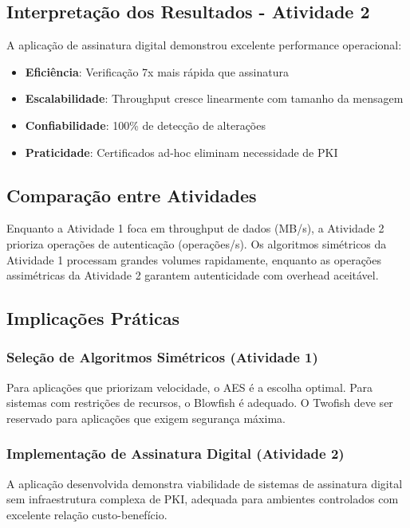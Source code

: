 \documentclass[12pt,a4paper,oneside]{article}
\begin{document}
\subsection{Interpretação dos Resultados - Atividade 2}

A aplicação de assinatura digital demonstrou excelente performance operacional:

\begin{itemize}
    \item \textbf{Eficiência}: Verificação 7x mais rápida que assinatura
    \item \textbf{Escalabilidade}: Throughput cresce linearmente com tamanho da mensagem
    \item \textbf{Confiabilidade}: 100\% de detecção de alterações
    \item \textbf{Praticidade}: Certificados ad-hoc eliminam necessidade de PKI
\end{itemize}

\subsection{Comparação entre Atividades}

Enquanto a Atividade 1 foca em throughput de dados (MB/s), a Atividade 2 prioriza operações de autenticação (operações/s). Os algoritmos simétricos da Atividade 1 processam grandes volumes rapidamente, enquanto as operações assimétricas da Atividade 2 garantem autenticidade com overhead aceitável.

\subsection{Implicações Práticas}

\subsubsection{Seleção de Algoritmos Simétricos (Atividade 1)}

Para aplicações que priorizam velocidade, o AES é a escolha optimal. Para sistemas com restrições de recursos, o Blowfish é adequado. O Twofish deve ser reservado para aplicações que exigem segurança máxima.

\subsubsection{Implementação de Assinatura Digital (Atividade 2)}

A aplicação desenvolvida demonstra viabilidade de sistemas de assinatura digital sem infraestrutura complexa de PKI, adequada para ambientes controlados com excelente relação custo-benefício.
\end{document}
